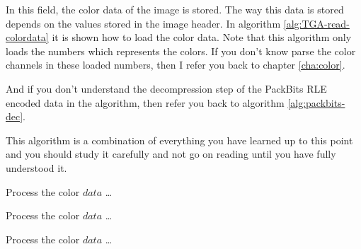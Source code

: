 
In this field, the color data of the image is stored. The way this
data is stored depends on the values stored in the image header. In
algorithm \ref{alg:TGA-read-colordata} it is shown how to load the
color data. Note that this algorithm only loads the numbers which
represents the colors. If you don't know parse the color channels in
these loaded numbers, then I refer you back to chapter
\ref{cha:color}.

And if you don't understand the decompression step of the PackBits RLE
encoded data in the algorithm, then refer you back to algorithm
\ref{alg:packbits-dec}.

This algorithm is a combination of everything you have learned up to
this point and you should study it carefully and not go on reading until
you have fully understood it.

\begin{algorithm}[H]
  \caption{Reading and decompressing the color data of a TGA file.}
  \label{alg:TGA-read-colordata}
  \newcommand{\process}{\State Process the color $data$ \dots}
  \begin{algorithmic}[1]





        \EndIf

          \process
        \EndRepeatn

    \Else



        \EndIf

        \process


        \EndRepeatn

       \EndIf
    \Else


      \EndIf

      \process


    \EndIf
    \EndWhile
  \end{algorithmic}
\end{algorithm}

